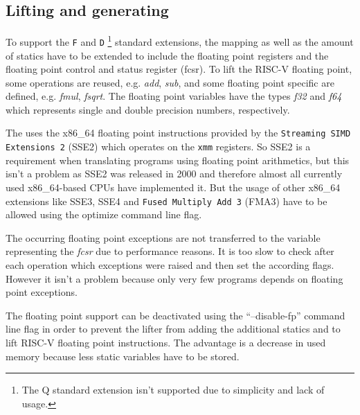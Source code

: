 \documentclass[course=eragp]{aspdoc}
\begin{document}
\subsection{Lifting and generating}

To support the \texttt{F} and \texttt{D}
\footnote{The Q standard extension isn't supported due to simplicity and lack of usage.}
standard extensions, the mapping as well as the amount of statics have to be extended to include the
floating point registers and the floating point control and status register (fcsr). To lift the
RISC-V floating point, some operations are reused, e.g. \emph{add}, \emph{sub}, and some floating
point specific are defined, e.g. \emph{fmul}, \emph{fsqrt}. The floating point variables have the
types \emph{f32} and \emph{f64} which represents single and double precision numbers, respectively.

\par

The  uses the x86\_64 floating point instructions provided by the
\texttt{Streaming SIMD Extensions 2} (SSE2) which operates on the \texttt{xmm} registers. So SSE2 is
a requirement when translating programs using floating point arithmetics, but this isn't a problem
as SSE2 was released in 2000 and therefore almost all currently used x86\_64-based CPUs have
implemented it. But the usage of other x86\_64 extensions like SSE3, SSE4 and \texttt{Fused Multiply
    Add 3} (FMA3) have to be allowed using the optimize command line flag.

\par

The occurring floating point exceptions are not transferred to the variable representing the
\emph{fcsr} due to performance reasons. It is too slow to check after each operation which
exceptions were raised and then set the according flags. However it isn't a problem because only
very few programs depends on floating point exceptions.

\par

The floating point support can be deactivated using the ``--disable-fp'' command line flag in order
to prevent the lifter from adding the additional statics and to lift RISC-V floating point
instructions. The advantage is a decrease in used memory because less static variables have to be
stored.

\par
\end{document}
